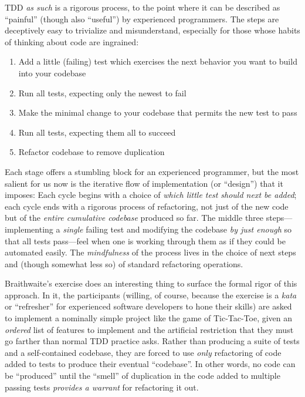TDD \emph{as such} is a rigorous process, to the point where it can be described as ``painful'' (though also ``useful'') by experienced programmers. The steps are deceptively easy to trivialize and misunderstand, especially for those whose habits of thinking about code are ingrained:

\begin{enumerate}
\item Add a little (failing) test which exercises the next behavior you want to build into your codebase
\item Run all tests, expecting only the newest to fail
\item Make the minimal change to your codebase that permits the new test to pass
\item Run all tests, expecting them all to succeed
\item Refactor codebase to remove duplication
\end{enumerate}

Each stage offers a stumbling block for an experienced programmer, but the most salient for us now is the iterative flow of implementation (or ``design'') that it imposes: Each cycle begins with a choice of \emph{which little test should next be added}; each cycle ends with a rigorous process of refactoring, not just of the new code but of the \emph{entire cumulative codebase} produced so far. The middle three steps---implementing a \emph{single} failing test and modifying the codebase \emph{by just enough} so that all tests pass---feel when one is working through them as if they could be automated easily. The \emph{mindfulness} of the process lives in the choice of next steps and (though somewhat less so) of standard refactoring operations.

Braithwaite's exercise does an interesting thing to surface the formal rigor of this approach. In it, the participants (willing, of course, because the exercise is a \emph{kata} or ``refresher'' for experienced software developers to hone their skills) are asked to implement a nominally simple project like the game of Tic-Tac-Toe, given an \emph{ordered} list of features to implement and the artificial restriction that they must go farther than normal TDD practice asks. Rather than producing a suite of tests and a self-contained codebase, they are forced to use \emph{only} refactoring of code added to tests to produce their eventual ``codebase''. In other words, no code can be ``produced'' until the ``smell'' of duplication in the code added to multiple passing tests \emph{provides a warrant} for refactoring it out.

